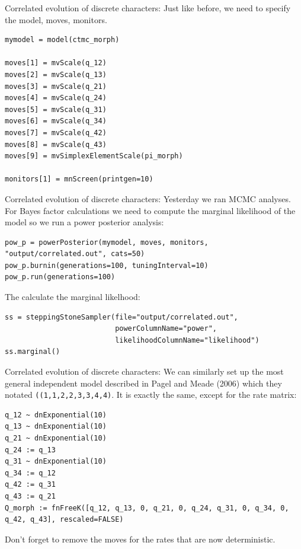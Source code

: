 \documentclass[mathserif]{beamer}
\begin{document}
\begin{frame}[fragile]
    \begin{block}{Correlated evolution of discrete characters:}
    \bigskip
Just like before, we need to specify the model, moves, monitors.\\
    \bigskip
    \begin{lstlisting}
mymodel = model(ctmc_morph)

moves[1] = mvScale(q_12)
moves[2] = mvScale(q_13)
moves[3] = mvScale(q_21)
moves[4] = mvScale(q_24)
moves[5] = mvScale(q_31)
moves[6] = mvScale(q_34)
moves[7] = mvScale(q_42)
moves[8] = mvScale(q_43)
moves[9] = mvSimplexElementScale(pi_morph)

monitors[1] = mnScreen(printgen=10)
    \end{lstlisting}
    \end{block}
\end{frame}


\begin{frame}[fragile]
    \begin{block}{Correlated evolution of discrete characters:}
    \bigskip
Yesterday we ran MCMC analyses. For Bayes factor calculations
we need to compute the marginal likelihood of the model so
we run a power posterior analysis:\\
    \bigskip
    \begin{lstlisting}
pow_p = powerPosterior(mymodel, moves, monitors, "output/correlated.out", cats=50)
pow_p.burnin(generations=100, tuningInterval=10)
pow_p.run(generations=100)
    \end{lstlisting}
    \bigskip
The calculate the marginal likelhood:\\
    \bigskip
    \begin{lstlisting}
ss = steppingStoneSampler(file="output/correlated.out", 
                          powerColumnName="power", 
                          likelihoodColumnName="likelihood")
ss.marginal()
    \end{lstlisting}
    \end{block}
\end{frame}


\begin{frame}[fragile]
    \begin{block}{Correlated evolution of discrete characters:}
    \bigskip
We can similarly set up the most general \alert{independent}
        model described in Pagel and Meade (2006) which they notated \texttt{((1,1,2,2,3,3,4,4)}.
 It is exactly the same, except for the rate matrix:\\
    \bigskip
    \begin{lstlisting}
q_12 ~ dnExponential(10)
q_13 ~ dnExponential(10)
q_21 ~ dnExponential(10)
q_24 := q_13
q_31 ~ dnExponential(10)
q_34 := q_12
q_42 := q_31
q_43 := q_21
Q_morph := fnFreeK([q_12, q_13, 0, q_21, 0, q_24, q_31, 0, q_34, 0, q_42, q_43], rescaled=FALSE)
    \end{lstlisting}
\bigskip
Don't forget to remove the moves for the rates that are now deterministic.\\
    \end{block}
\end{frame}
\end{document}
